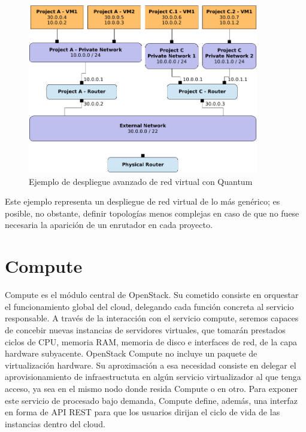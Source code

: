 \begin{figure}[tbh]
\begin{center}
\includegraphics[width=0.9\textwidth]{imagenes/014.pdf}
 \caption{Ejemplo de despliegue avanzado de red virtual con Quantum}
\label{fig:desplieguequantum}
\end{center}
\end{figure}

Este ejemplo representa un despliegue de red virtual de lo m\'as gen\'erico; es posible, no obstante, definir topolog\'ias menos complejas en caso de que no fuese necesaria la aparici\'on de un enrutador en cada proyecto.


\section{Compute}\label{sec:compute}
\noindent Compute es el m\'odulo central de OpenStack. Su cometido consiste en orquestar el funcionamiento global del cloud, delegando cada funci\'on concreta al servicio responsable. A trav\'es de la interacci\'on con el servicio compute, seremos capaces de concebir nuevas instancias de servidores virtuales, que tomar\'an prestados ciclos de CPU, memoria RAM, memoria de disco e interfaces de red, de la capa hardware subyacente. OpenStack Compute no incluye un paquete de virtualizaci\'on hardware. Su aproximaci\'on a esa necesidad consiste en delegar el aprovisionamiento de infraestructuta en alg\'un servicio vir\-tua\-li\-za\-dor al que tenga acceso, ya sea en el mismo nodo donde resida Compute o en otro. Para exponer este servicio de procesado bajo demanda, Compute define, adem\'as, una interfaz en forma de API REST para que los usuarios dirijan el ciclo de vida de las instancias dentro del cloud.\newline

